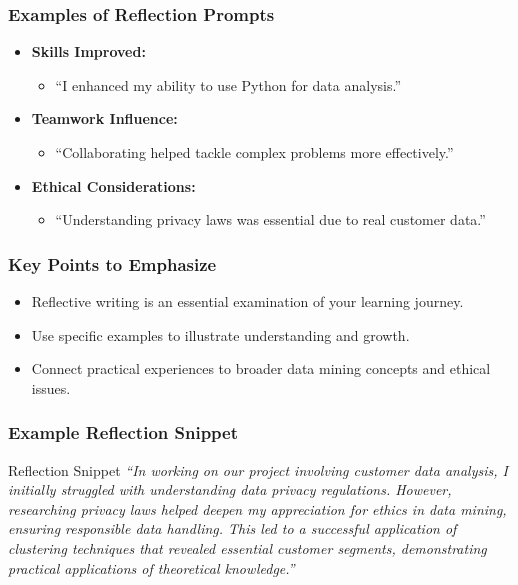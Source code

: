 \documentclass[aspectratio=169]{beamer}
\begin{document}
\begin{frame}[fragile]
    \frametitle{Examples of Reflection Prompts}
    \begin{itemize}
        \item \textbf{Skills Improved:} 
            \begin{itemize}
                \item “I enhanced my ability to use Python for data analysis.”
            \end{itemize}
        \item \textbf{Teamwork Influence:} 
            \begin{itemize}
                \item “Collaborating helped tackle complex problems more effectively.”
            \end{itemize}
        \item \textbf{Ethical Considerations:} 
            \begin{itemize}
                \item “Understanding privacy laws was essential due to real customer data.”
            \end{itemize}
    \end{itemize}
\end{frame}

\begin{frame}[fragile]
    \frametitle{Key Points to Emphasize}
    \begin{itemize}
        \item Reflective writing is an essential examination of your learning journey.
        \item Use specific examples to illustrate understanding and growth.
        \item Connect practical experiences to broader data mining concepts and ethical issues.
    \end{itemize}
\end{frame}

\begin{frame}[fragile]
    \frametitle{Example Reflection Snippet}
    \begin{block}{Reflection Snippet}
    \textit{“In working on our project involving customer data analysis, I initially struggled with understanding data privacy regulations. However, researching privacy laws helped deepen my appreciation for ethics in data mining, ensuring responsible data handling. This led to a successful application of clustering techniques that revealed essential customer segments, demonstrating practical applications of theoretical knowledge.”}
    \end{block}
\end{frame}
\end{document}
